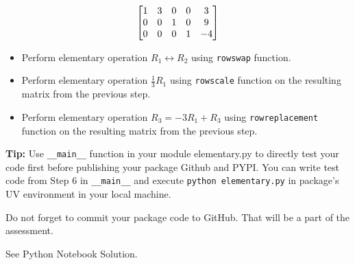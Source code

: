 \documentclass[12pt, xcolor=dvipsnames,svgnames,x11names]{article}
\makeatletter
\newenvironment{multiequation}[1][]{%
\begin{equation}%
   \begin{aligned}%
   \ifx#1\@empty\else\label{#1}\fi%
}{%
   \end{aligned}%
\end{equation}%
}
\makeatother
\begin{document}
\begin{enumerate}
    \begin{multiequation}
        \begin{bmatrix}
        1 & 3 & 0 & 0 & 3\\
        0 & 0 & 1 & 0 & 9\\
        0 & 0 & 0 & 1 & -4
    \end{bmatrix}
    \end{multiequation}

    \begin{itemize}
        \item Perform elementary operation $R_1 \leftrightarrow  R_2$  using \texttt{rowswap} function.
        \item Perform elementary operation $\frac{1}{3}R_1$  using \texttt{rowscale} function on the resulting matrix from the previous step.
        \item Perform elementary operation $R_3 = -3R_1 + R_3$  using \texttt{rowreplacement} function on the resulting matrix from the previous step.
    \end{itemize}
\end{enumerate}

\textbf{Tip:} Use \texttt{\_\_main\_\_} function in your module {elementary.py} to directly test your code first before publishing your package Github and PYPI. You can write test code from Step 6 in \texttt{\_\_main\_\_} and execute \texttt{python elementary.py} in package's UV environment in your local machine.

Do not forget to commit your package code to GitHub. That will be a part of the assessment.

\begin{answerbox}
See Python Notebook Solution.
\end{answerbox}
\end{document}
